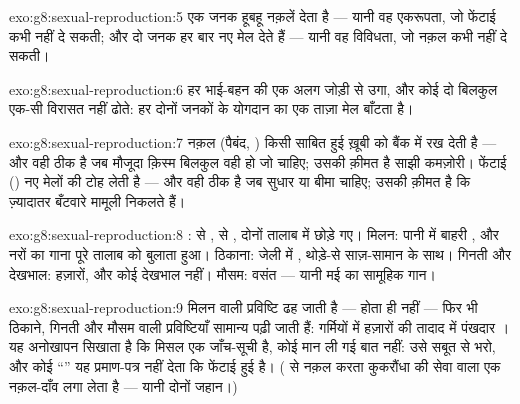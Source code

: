 \begin{solution}{exo:g8:sexual-reproduction:5}
एक जनक हूबहू नक़लें देता है --- यानी वह एकरूपता, जो फेंटाई कभी नहीं दे
सकती; और दो जनक हर बार नए मेल देते हैं --- यानी वह विविधता, जो नक़ल कभी
नहीं दे सकती।
\end{solution}

\begin{solution}{exo:g8:sexual-reproduction:6}
हर भाई-बहन  की एक अलग जोड़ी से उगा, और कोई दो  बिलकुल
एक-सी विरासत नहीं ढोते: हर  दोनों जनकों के योगदान का एक ताज़ा मेल
बाँटता है।
\end{solution}

\begin{solution}{exo:g8:sexual-reproduction:7}
नक़ल (पैबंद, ) किसी साबित हुई ख़ूबी को बैंक में रख देती है --- और वही
ठीक है जब मौजूदा क़िस्म बिलकुल वही हो जो चाहिए; उसकी क़ीमत है साझी
कमज़ोरी। फेंटाई () नए मेलों की टोह लेती है --- और वही ठीक है जब सुधार
या बीमा चाहिए; उसकी क़ीमत है कि ज़्यादातर बँटवारे मामूली निकलते हैं।
\end{solution}

\begin{solution}{exo:g8:sexual-reproduction:8}
:  से ,  से , दोनों तालाब में छोड़े गए। मिलन:
पानी में बाहरी , और नरों का गाना पूरे तालाब को बुलाता हुआ।
ठिकाना: जेली में , थोड़े-से साज़-सामान के साथ। गिनती और देखभाल:
हज़ारों, और कोई देखभाल नहीं। मौसम: वसंत --- यानी मई का सामूहिक गान।
\end{solution}

\begin{solution}{exo:g8:sexual-reproduction:9}
मिलन वाली प्रविष्टि ढह जाती है ---  होता ही नहीं --- फिर भी
ठिकाने, गिनती और मौसम वाली प्रविष्टियाँ सामान्य पढ़ी जाती हैं: गर्मियों
में हज़ारों की तादाद में पंखदार । यह अनोखापन सिखाता है कि मिसल एक
जाँच-सूची है, कोई मान ली गई बात नहीं: उसे सबूत से भरो, और कोई ``''
यह प्रमाण-पत्र नहीं देता कि फेंटाई हुई है। ( से नक़ल करता कुकरौंधा
 की सेवा वाला एक नक़ल-दाँव लगा लेता है --- यानी दोनों जहान।)
\end{solution}

